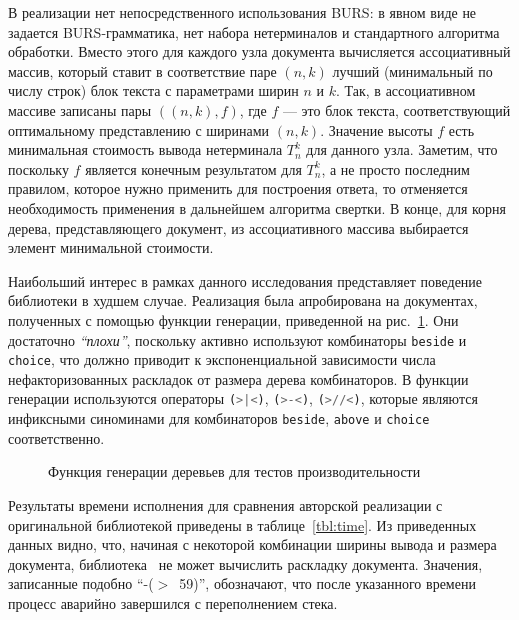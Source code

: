В реализации нет непосредственного использования BURS: в явном виде не задается BURS-грамматика,
нет набора нетерминалов и стандартного алгоритма обработки.
Вместо этого для каждого узла документа вычисляется ассоциативный массив, который
ставит в соответствие паре $(n, k)$ лучший (минимальный по числу строк) блок текста с параметрами
ширин $n$ и $k$. Так, в ассоциативном массиве записаны пары $((n, k), f)$, где $f$ --- это
блок текста, соответствующий оптимальному представлению с ширинами $(n, k)$. Значение
высоты $f$ есть минимальная стоимость вывода нетерминала $T^k_n$ для данного узла.
Заметим, что поскольку $f$ является конечным результатом для $T^k_n$, а не просто
последним правилом, которое нужно применить для построения ответа, то отменяется
необходимость применения в дальнейшем алгоритма свертки.
В конце, для корня дерева, представляющего документ, из
ассоциативного массива выбирается элемент минимальной стоимости.

Наибольший интерес в рамках данного исследования представляет поведение библиотеки
в худшем случае.
Реализация была апробирована на документах, полученных с помощью
функции генерации, приведенной на рис.~\ref{fig:treeToDocMy}. Они достаточно
\emph{``плохи''}, поскольку активно используют комбинаторы
\lstinline[language= Haskell]{beside} и
\lstinline[language= Haskell]{choice}, что должно приводит к экспоненциальной зависимости
числа нефакторизованных раскладок от размера дерева комбинаторов.
В функции генерации используются операторы
\lstinline[language= Haskell]{(>|<)},
\lstinline[language= Haskell]{(>-<)},
\lstinline[language= Haskell]{(>//<)}, которые являются инфиксными синоминами для
комбинаторов
\lstinline[language= Haskell]{beside},
\lstinline[language= Haskell]{above} и
\lstinline[language= Haskell]{choice} соответственно.

\begin{figure}[h!]
  
  \caption{Функция генерации деревьев для тестов производительности}
  \label{fig:treeToDocMy}
\end{figure}

Результаты времени исполнения для сравнения авторской реализации с оригинальной библиотекой
приведены в таблице~\ref{tbl:time}.
Из приведенных данных видно, что, начиная с некоторой комбинации ширины вывода и размера документа,
библиотека~\cite{swierstra} не может вычислить раскладку документа.
Значения, записанные подобно \mbox{``-($>$ 59)''}, обозначают,
что после указанного времени процесс аварийно завершился с переполнением стека.

